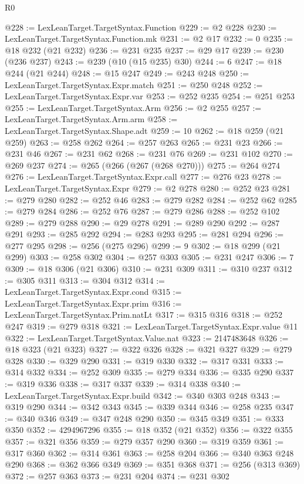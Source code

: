 \begin{lexlean}{R0}
\begin{coremodule}
@228 := LexLeanTarget.TargetSyntax.Function
@229 := @2 @228
@230 := LexLeanTarget.TargetSyntax.Function.mk
@231 := @2 @17
@232 := 0
@235 := @18 @232 (@21 @232)
@236 := @231 @235
@237 := @29 @17
@239 := @230 (@236 @237)
@243 := @239 (@10 (@15 @235) @30)
@244 := 6
@247 := @18 @244 (@21 @244)
@248 := @15 @247
@249 := @243 @248
@250 := LexLeanTarget.TargetSyntax.Expr.match
@251 := @250 @248
@252 := LexLeanTarget.TargetSyntax.Expr.var
@253 := @252 @235
@254 := @251 @253
@255 := LexLeanTarget.TargetSyntax.Arm
@256 := @2 @255
@257 := LexLeanTarget.TargetSyntax.Arm.arm
@258 := LexLeanTarget.TargetSyntax.Shape.adt
@259 := 10
@262 := @18 @259 (@21 @259)
@263 := @258 @262
@264 := @257 @263
@265 := @231 @23
@266 := @231 @46
@267 := @231 @62
@268 := @231 @76
@269 := @231 @102
@270 := @269 @237
@274 := @265 (@266 (@267 (@268 @270)))
@275 := @264 @274
@276 := LexLeanTarget.TargetSyntax.Expr.call
@277 := @276 @23
@278 := LexLeanTarget.TargetSyntax.Expr
@279 := @2 @278
@280 := @252 @23
@281 := @279 @280
@282 := @252 @46
@283 := @279 @282
@284 := @252 @62
@285 := @279 @284
@286 := @252 @76
@287 := @279 @286
@288 := @252 @102
@289 := @279 @288
@290 := @29 @278
@291 := @289 @290
@292 := @287 @291
@293 := @285 @292
@294 := @283 @293
@295 := @281 @294
@296 := @277 @295
@298 := @256 (@275 @296)
@299 := 9
@302 := @18 @299 (@21 @299)
@303 := @258 @302
@304 := @257 @303
@305 := @231 @247
@306 := 7
@309 := @18 @306 (@21 @306)
@310 := @231 @309
@311 := @310 @237
@312 := @305 @311
@313 := @304 @312
@314 := LexLeanTarget.TargetSyntax.Expr.cond
@315 := LexLeanTarget.TargetSyntax.Expr.prim
@316 := LexLeanTarget.TargetSyntax.Prim.natLt
@317 := @315 @316
@318 := @252 @247
@319 := @279 @318
@321 := LexLeanTarget.TargetSyntax.Expr.value @11
@322 := LexLeanTarget.TargetSyntax.Value.nat
@323 := 2147483648
@326 := @18 @323 (@21 @323)
@327 := @322 @326
@328 := @321 @327
@329 := @279 @328
@330 := @329 @290
@331 := @319 @330
@332 := @317 @331
@333 := @314 @332
@334 := @252 @309
@335 := @279 @334
@336 := @335 @290
@337 := @319 @336
@338 := @317 @337
@339 := @314 @338
@340 := LexLeanTarget.TargetSyntax.Expr.build
@342 := @340 @303 @248
@343 := @319 @290
@344 := @342 @343
@345 := @339 @344
@346 := @258 @235
@347 := @340 @346
@349 := @347 @248 @290
@350 := @345 @349
@351 := @333 @350
@352 := 4294967296
@355 := @18 @352 (@21 @352)
@356 := @322 @355
@357 := @321 @356
@359 := @279 @357 @290
@360 := @319 @359
@361 := @317 @360
@362 := @314 @361
@363 := @258 @204
@366 := @340 @363 @248 @290
@368 := @362 @366 @349
@369 := @351 @368
@371 := @256 (@313 @369)
@372 := @257 @363
@373 := @231 @204
@374 := @231 @302

\end{coremodule}
\end{lexlean}
